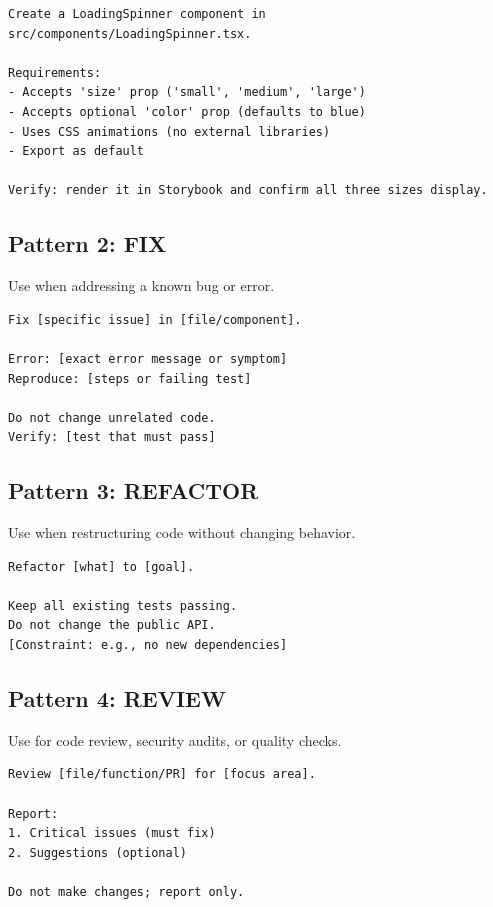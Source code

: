 \begin{lstlisting}[caption={CREATE: a TypeScript React component}]
Create a LoadingSpinner component in src/components/LoadingSpinner.tsx.

Requirements:
- Accepts 'size' prop ('small', 'medium', 'large')
- Accepts optional 'color' prop (defaults to blue)
- Uses CSS animations (no external libraries)
- Export as default

Verify: render it in Storybook and confirm all three sizes display.
\end{lstlisting}

\subsection{Pattern 2: FIX}

Use when addressing a known bug or error.

\begin{lstlisting}[caption={FIX pattern template}]
Fix [specific issue] in [file/component].

Error: [exact error message or symptom]
Reproduce: [steps or failing test]

Do not change unrelated code.
Verify: [test that must pass]
\end{lstlisting}

\subsection{Pattern 3: REFACTOR}

Use when restructuring code without changing behavior.

\begin{lstlisting}[caption={REFACTOR pattern template}]
Refactor [what] to [goal].

Keep all existing tests passing.
Do not change the public API.
[Constraint: e.g., no new dependencies]
\end{lstlisting}

\subsection{Pattern 4: REVIEW}

Use for code review, security audits, or quality checks.

\begin{lstlisting}[caption={REVIEW pattern template}]
Review [file/function/PR] for [focus area].

Report:
1. Critical issues (must fix)
2. Suggestions (optional)

Do not make changes; report only.
\end{lstlisting}

